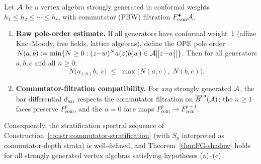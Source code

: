 \begin{theorem}
\label{thm:pole-non-increase}
Let $\mathcal{A}$ be a vertex algebra strongly generated in conformal weights
$h_1\le h_2\le\cdots\le h_r$, with commutator \textup{(}PBW\textup{)}
filtration $F_{\mathrm{com}}^\bullet\mathcal{A}$.
\begin{enumerate}[label=\textup{(\roman*)}]
\item\label{item:pole-non-increase-raw}
\textbf{Raw pole-order estimate.} If all generators have conformal
weight~$1$ \textup{(}affine Kac--Moody, free fields, lattice
algebras\textup{)}, define the OPE pole order $N(a,b):=\min\{N\ge 0:
(z{-}w)^N a(z)b(w)\in\mathcal{A}[[z{-}w]]\}$. Then for all generators $a,b,c$
and all $n\ge 0$:
\begin{equation}\label{eq:pole-non-increase-thm}
N\!\bigl(a_{(n)}b,\;c\bigr)
\;\le\;
\max\!\bigl(N(a,c),\;N(b,c)\bigr).
\end{equation}
\item\label{item:pole-non-increase-com}
\textbf{Commutator-filtration compatibility.} For \emph{any} strongly
generated $\mathcal{A}$, the bar differential $d_{\mathrm{bar}}$ respects the
commutator filtration on ${\overline{B}^{\mathrm{ch}}}(\mathcal{A})$:
the $n\ge 1$ faces preserve $F^p_{\mathrm{com}}$, and the $n=0$ face maps
$F^p_{\mathrm{com}}\to F^{p+1}_{\mathrm{com}}$.
\end{enumerate}
Consequently, the stratification spectral sequence of
Construction~\textup{\ref{constr:commutator-stratification}}
\textup{(}with $S_p$ interpreted as commutator-depth strata\textup{)} is
well-defined, and Theorem~\textup{\ref{thm:FG-shadow}} holds for all
strongly generated vertex algebras satisfying hypotheses
\textup{(a)--(c)}.
\end{theorem}

